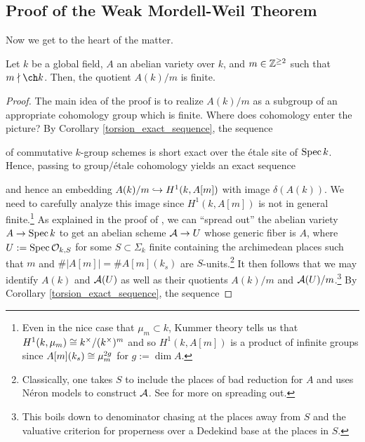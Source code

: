 \documentclass[11pt]{article}
\begin{document}
\subsection{Proof of the Weak Mordell-Weil Theorem}
Now we get to the heart of the matter.

\begin{theorem}\label{WMW_Thm}
Let $k$ be a global field, $A$ an abelian variety over $k$, and $m\in\mathbb{Z}^{\geq2}$ such that $m\nmid\ch k$. Then, the quotient $A(k)/m$ is finite.
\end{theorem}

\begin{proof}
The main idea of the proof is to realize $A(k)/m$ as a subgroup of an appropriate cohomology group which is finite. Where does cohomology enter the picture? By Corollary \ref{torsion_exact_sequence}, the sequence
\begin{center}
\end{center}
of commutative $k$-group schemes is short exact over the \'{e}tale site of $\operatorname{Spec} k$. Hence, passing to group/\'{e}tale cohomology yields an exact sequence 
\begin{center}
\end{center}
and hence an embedding $A(k)/m\hookrightarrow H^1(k,A[m])$ with image $\delta(A(k))$. We need to carefully analyze this image since $H^1(k,A[m])$ is not in general finite.\footnote{Even in the nice case that $\mu_m\subset k$, Kummer theory tells us that $H^1(k,\mu_m)\cong k^{\times}/(k^{\times})^m$ and so $H^1(k,A[m])$ is a product of infinite groups since $A[m](k_s)\cong\mu_m^{2g}$ for $g:=\dim A$.} As explained in the proof of \cite[\textrm{Thm 9.3.11}]{Conrad}, we can ``spread out'' the abelian variety $A\to\operatorname{Spec} k$ to get an abelian scheme $\mathcal{A}\to U$ whose generic fiber is $A$, where $U:=\operatorname{Spec}\mathcal{O}_{k,S}$ for some $S\subset\Sigma_k$ finite containing the archimedean places such that $m$ and $\#|A[m]|=\#A[m](k_s)$ are $S$-units.\footnote{Classically, one takes $S$ to include the places of bad reduction for $A$ and uses N\'{e}ron models to construct $\mathcal{A}$. See \cite[Section 3.2]{Poonen_Var} for more on spreading out.} It then follows that we may identify $A(k)$ and $\mathcal{A}(U)$ as well as their quotients $A(k)/m$ and $\mathcal{A}(U)/m$.\footnote{This boils down to denominator chasing at the places away from $S$ and the valuative criterion for properness over a Dedekind base at the places in $S$.} By Corollary \ref{torsion_exact_sequence}, the sequence 

\end{proof}
\end{document}
